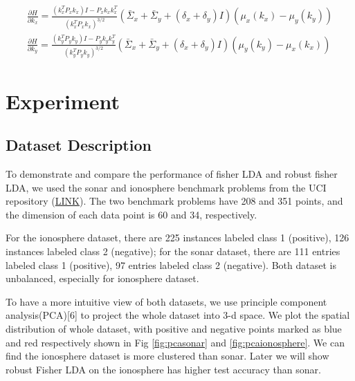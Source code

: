 \documentclass{article} %
\begin{document}
\begin{align}
\frac{\partial H}{\partial k_x} = \frac{(k_x^T P_x k_x)I - P_x k_x k_x^T}{(k_x^T P_x k_x)^{3/2}} (\bar{\Sigma}_x + \bar{\Sigma}_y + (\delta_x + \delta_y) I) (\mu_x(k_x) - \mu_y(k_y)) \\
\frac{\partial H}{\partial k_y} = \frac{(k_y^T P_y k_y)I - P_y k_y k_y^T}{(k_y^T P_y k_y)^{3/2}} (\bar{\Sigma}_x + \bar{\Sigma}_y + (\delta_x + \delta_y) I) (\mu_y(k_y) - \mu_x(k_x))
\end{align}

\section{Experiment}
\subsection{Dataset Description}
To demonstrate and compare the performance of fisher LDA and robust fisher LDA, we used the sonar and ionosphere benchmark problems from the UCI repository (\href{www.ics.uci.edu/~mlearn/MLRepository.html}{LINK}). The two benchmark problems have 208 and 351 points, and the dimension of each data point is 60 and 34, respectively.

For the ionosphere dataset, there are 225 instances labeled class 1 (positive), 126 instances labeled class 2 (negative); for the sonar dataset, there are 111 entries labeled class 1 (positive), 97 entries labeled class 2 (negative). Both dataset is unbalanced, especially for ionosphere dataset.

To have a more intuitive view of both datasets, we use principle component analysis(PCA)[6] to project the whole dataset into 3-d space. We plot the spatial distribution of whole dataset, with positive and negative points marked as blue and red respectively shown in Fig \ref{fig:pcasonar} and \ref{fig:pcaionosphere}.  We can find the ionosphere dataset is more clustered than sonar. Later we will show robust Fisher LDA on the ionosphere has higher test accuracy than sonar.
\end{document}
